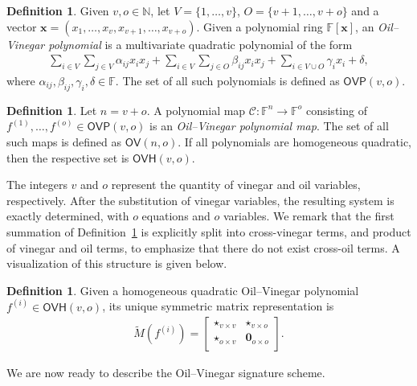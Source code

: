\documentclass[english]{ufsc-thesis-rn46-2019/ufsc-thesis-rn46-2019}
\theoremstyle{definition}
\newtheorem{definition}[theorem]{Definition}
\begin{document}
\begin{definition}\label{def:oil-vinegar-poly}
  Given $v, o \in \mathbb{N}$, let $V = \{1, \dots, v\}$,
  $O = \{v + 1, \dots, v + o\}$ and a vector
  $\mathbf{x} = (x_{1}, \dots, x_{v}, x_{v + 1}, \dots, x_{v + o})$. Given a
  polynomial ring $\mathbb{F}[\mathbf{x}]$, an \emph{Oil--Vinegar polynomial}
  is a multivariate quadratic polynomial of the form
  \begin{align}
    \sum_{i \in V} \sum_{j \in V} \alpha_{ij} x_{i} x_{j}
      + \sum_{i \in V} \sum_{j \in O} \beta_{ij} x_{i} x_{j}
      + \sum_{i \in V \cup O} \gamma_{i} x_{i}
      + \delta,
  \end{align}
  where $\alpha_{ij}, \beta_{ij}, \gamma_{i}, \delta \in \mathbb{F}$. The set
  of all such polynomials is defined as $\mathsf{OVP}(v, o)$.
\end{definition}

\begin{definition}
  Let $n = v + o$. A polynomial map
  $\mathcal{C} : \mathbb{F}^{n} \to \mathbb{F}^{o}$ consisting of
  $f^{(1)}, \dots, f^{(o)} \in \mathsf{OVP}(v, o)$ is an \emph{Oil--Vinegar
  polynomial map}. The set of all such maps is defined as $\mathsf{OV}(n, o)$.
  If all polynomials are homogeneous quadratic, then the respective set is
  $\mathsf{OVH}(v, o)$.
\end{definition}

The integers $v$ and $o$ represent the quantity of vinegar and oil variables,
respectively. After the substitution of vinegar variables, the resulting system
is exactly determined, with $o$ equations and $o$ variables. We remark that the
first summation of Definition~\ref{def:oil-vinegar-poly} is explicitly split
into cross-vinegar terms, and product of vinegar and oil terms, to emphasize
that there do not exist cross-oil terms. A visualization of this structure is
given below.

\begin{definition}\label{def:ovh-matrix}
  Given a homogeneous quadratic Oil--Vinegar polynomial
  $f^{(i)} \in \mathsf{OVH}(v, o)$, its unique symmetric matrix representation
  is
  \begin{align}
    \widetilde{M}(f^{(i)}) =
    \begin{bmatrix}
      \star_{v \times v} & \star_{v \times o}      \\
      \star_{o \times v} & \mathbf{0}_{o \times o} \\
    \end{bmatrix}.
  \end{align}
\end{definition}
We are now ready to describe the Oil--Vinegar signature scheme.
\end{document}
